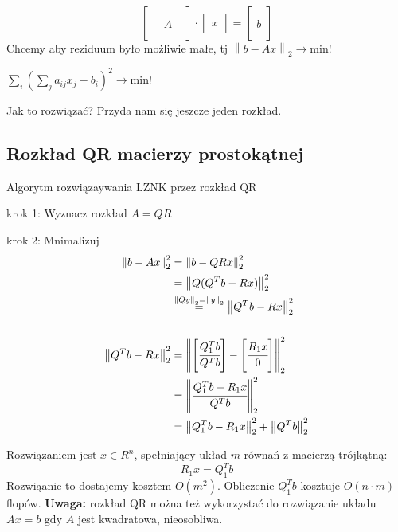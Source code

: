 \documentclass[hidelinks,a4paper]{article}
\newcommand{\ra}{\rightarrow}
\newcommand{\norm}[1]{\left\lVert#1\right\rVert}
\begin{document}
\[
\left[
	\begin{array}{cc}
	 \\
	 \\
	 \quad A 
	 \\
	 \\ &
	\end{array}
\right]
	\cdot
\left[
	\begin{array}{c}
	 \\
	 x
	 \\ \ 
	\end{array}
\right]
=
\left[
	\begin{array}{c}
	 \\
	 \\
	 b
	 \\
	 \\ \ 
	\end{array}
\right]
\]
Chcemy aby reziduum było możliwie małe, tj $\norm{b - Ax}_2 \ra \textrm{min}$!

$\sum_{i}(\sum_{j} a_{ij} x_{j} - b_{i})^2 \ra \textrm{min}$!

Jak to rozwiązać? Przyda nam się jeszcze jeden rozkład.

\subsection{Rozkład QR macierzy prostokątnej}

Algorytm rozwiązaywania LZNK przez rozkład QR


krok 1: Wyznacz rozkład $A = QR$

krok 2: Mnimalizuj \begin{align*}
\norm{b - Ax}_2^2 &= \norm{b - QRx}^2_2 \\
& = \norm{Q(Q^Tb - Rx)}_2^2 \\
& \stackrel{\norm{Q y}_2 = \norm{y}_2}{=} \norm{Q^Tb - Rx}_2^2 \\
\\
 \norm{Q^Tb - Rx}_2^2 & = \norm{\left[\cfrac{Q_1^Tb}{Q^Tb}\right] - \left[\cfrac{R_1x}{0}\right]}_2^2 \\
 & = \norm{\cfrac{Q_1^Tb - R_1x}{Q^T b}}_2^2 \\
 & = \norm{Q_1^Tb - R_1x}_2^2 + \norm{Q^T b}_2^2
\end{align*}

Rozwiązaniem jest $x \in R^n$, spełniający układ $m$ równań z macierzą trójkątną:
\[
	R_1x = Q_1^Tb
\]
Rozwiąanie to dostajemy kosztem $O(m^2)$. Obliczenie $Q_1^Tb$ kosztuje $O(n \cdot m)$ flopów. \textbf{Uwaga: }rozkład QR można też wykorzystać do rozwiązanie układu $Ax=b$ gdy $A$ jest kwadratowa, nieosobliwa.
\end{document}
